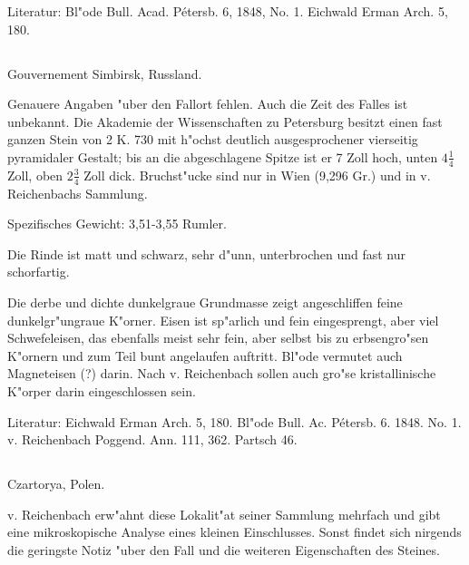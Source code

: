 \documentclass[a4paper, 11pt, oneside]{article}
\begin{document}
\normalsize
Literatur: Bl"ode Bull. Acad. Pétersb. 6, 1848, No. 1. Eichwald Erman Arch. 5, 180.

\subsection{}
\LARGE
\paragraph{}
Gouvernement Simbirsk, Russland.

Genauere Angaben "uber den Fallort fehlen. Auch die Zeit des Falles ist unbekannt. Die Akademie der Wissenschaften zu Petersburg besitzt einen fast ganzen Stein von 2 K. 730 mit h"ochst deutlich ausgesprochener vierseitig pyramidaler Gestalt; bis an die abgeschlagene Spitze ist er 7 Zoll hoch, unten $\mathfrak{4\frac{1}{4}}$ Zoll, oben $\mathfrak{2\frac{3}{4}}$ Zoll dick. Bruchst"ucke sind nur in Wien (9,296 Gr.) und in v. Reichenbachs Sammlung.

Spezifisches Gewicht: 3,51-3,55 Rumler.

Die Rinde ist matt und schwarz, sehr d"unn, unterbrochen und fast nur schorfartig.

Die derbe und dichte dunkelgraue Grundmasse zeigt angeschliffen feine dunkelgr"ungraue K"orner. Eisen ist sp"arlich und fein eingesprengt, aber viel Schwefeleisen, das ebenfalls meist sehr fein, aber selbst bis zu erbsengro"sen K"ornern und zum Teil bunt angelaufen auftritt. Bl"ode vermutet auch Magneteisen (?) darin. Nach v. Reichenbach sollen auch gro"se kristallinische K"orper darin eingeschlossen sein.

\normalsize
Literatur: Eichwald Erman Arch. 5, 180. Bl"ode Bull. Ac. Pétersb. 6. 1848. No. 1. v. Reichenbach Poggend. Ann. 111, 362. Partsch 46.

\subsection{}
\LARGE
\paragraph{}
Czartorya, Polen.

v. Reichenbach erw"ahnt diese Lokalit"at seiner Sammlung mehrfach und gibt eine mikroskopische Analyse eines kleinen Einschlusses. Sonst findet sich nirgends die geringste Notiz "uber den Fall und die weiteren Eigenschaften des Steines.
\end{document}
